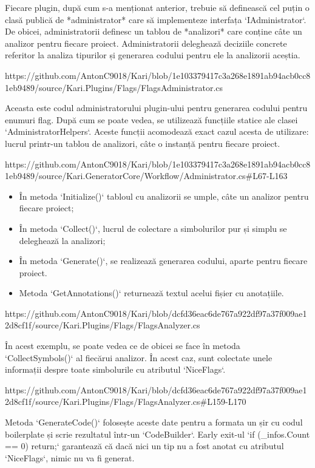 \documentclass{report}
\begin{document}
Fiecare plugin, după cum s-a menționat anterior, trebuie să definească cel puțin o clasă publică de *administrator* care să implementeze interfața `IAdministrator`.
De obicei, administratorii definesc un tablou de *analizori* care conține câte un analizor pentru fiecare proiect.
Administratorii deleghează deciziile concrete referitor la analiza tipurilor și generarea codului pentru ele la analizorii aceștia.

https://github.com/AntonC9018/Kari/blob/1e103379417c3a268e1891ab94acb0cc81eb9489/source/Kari.Plugins/Flags/FlagsAdministrator.cs

Aceasta este codul administratorului plugin-ului pentru generarea codului pentru enumuri flag.
După cum se poate vedea, se utilizează funcțiile statice ale clasei `AdministratorHelpers`.
Aceste funcții acomodează exact cazul acesta de utilizare: lucrul printr-un tablou de analizori, câte o instanță pentru fiecare proiect.

https://github.com/AntonC9018/Kari/blob/1e103379417c3a268e1891ab94acb0cc81eb9489/source/Kari.GeneratorCore/Workflow/Administrator.cs#L67-L163 

\begin{itemize}
  \item În metoda `Initialize()` tabloul cu analizorii se umple, câte un analizor pentru fiecare proiect;
  \item În metoda `Collect()`, lucrul de colectare a simbolurilor pur și simplu se deleghează la analizori;
  \item În metoda `Generate()`, se realizează generarea codului, aparte pentru fiecare proiect.
  \item Metoda `GetAnnotations()` returnează textul acelui fișier cu anotațiile.
\end{itemize}

https://github.com/AntonC9018/Kari/blob/dcfd36eac6de767a922df97a37f009ae12d8cf1f/source/Kari.Plugins/Flags/FlagsAnalyzer.cs

În acest exemplu, se poate vedea ce de obicei se face în metoda `CollectSymbols()` al fiecărui analizor.
În acest caz, sunt colectate unele informații despre toate simbolurile cu atributul `NiceFlags`.


https://github.com/AntonC9018/Kari/blob/dcfd36eac6de767a922df97a37f009ae12d8cf1f/source/Kari.Plugins/Flags/FlagsAnalyzer.cs#L159-L170

Metoda `GenerateCode()` folosește aceste date pentru a formata un șir cu codul boilerplate și scrie rezultatul într-un `CodeBuilder`.
Early exit-ul `if (_infos.Count == 0) return;` garantează că dacă nici un tip nu a fost anotat cu atributul `NiceFlags`, nimic nu va fi generat.
\end{document}
